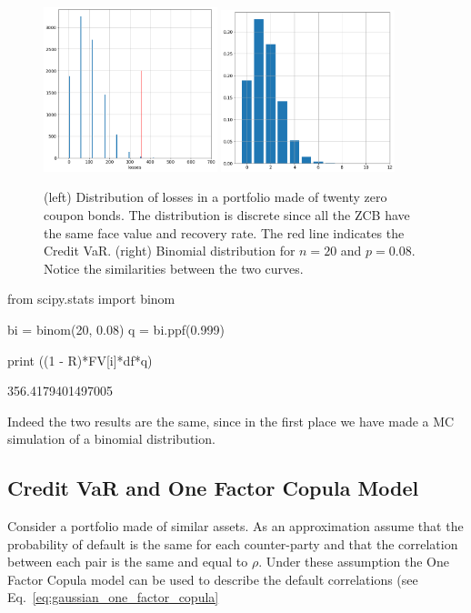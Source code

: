 \begin{figure}[htb]
\centering
\includegraphics[width=0.45\textwidth]{figures/credit_var_zcb}
\includegraphics[width=0.45\textwidth]{figures/binomial_zcb}
\caption{(left) Distribution of losses in a portfolio made of twenty zero coupon bonds. The distribution is discrete since all the ZCB have the same face value and recovery rate. The red line indicates the Credit VaR. (right) 
Binomial distribution for $n=20$ and $p=0.08$. Notice the similarities between the two curves.}
\label{fig:credit_var}
\end{figure}

\begin{ipython}
from scipy.stats import binom

bi = binom(20, 0.08)
q = bi.ppf(0.999)

print ((1 - R)*FV[i]*df*q)
\end{ipython}
\begin{ioutput}
356.4179401497005
\end{ioutput}

Indeed the two results are the same, since in the first place we have made a MC simulation of a binomial distribution.

\subsection{Credit VaR and One Factor Copula Model}
Consider a portfolio made of similar assets. As an approximation assume that the probability of default is the same for each counter-party and that the correlation between each pair is the same and equal to $\rho$. Under these assumption the One Factor Copula model can be used to describe the default correlations (see Eq.~\ref{eq:gaussian_one_factor_copula}

